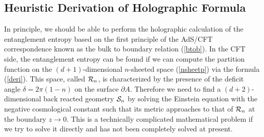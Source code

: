 \documentclass[12pt]{article}
\def\de{\partial}
\begin{document}
\subsection{Heuristic Derivation of Holographic Formula}
\hspace{5mm}
In principle, we should be able to perform the holographic calculation of
the entanglement entropy
based on the first principle of the AdS/CFT correspondence known
as the bulk to boundary relation (\ref{btob}). In the CFT side, the entanglement entropy
can be found if we can compute the partition function on the $(d+1)$-dimensional
$n$-sheeted space (\ref{nsheetp}) via
the formula (\ref{deri}). This space, called ${\cal R}_n$,
is characterized by the presence of the deficit angle
$\delta=2\pi(1-n)$ on the surface $\de A$.
Therefore we need to find a $(d+2)$-dimensional
back reacted geometry ${\cal S}_n$ by solving the Einstein equation
with the negative cosmological constant such that its metric approaches
to that of ${\cal R}_n$ at the boundary $z\to 0$. This is a technically complicated mathematical
problem if we try to solve it directly and has
not been completely solved at present.
\end{document}
